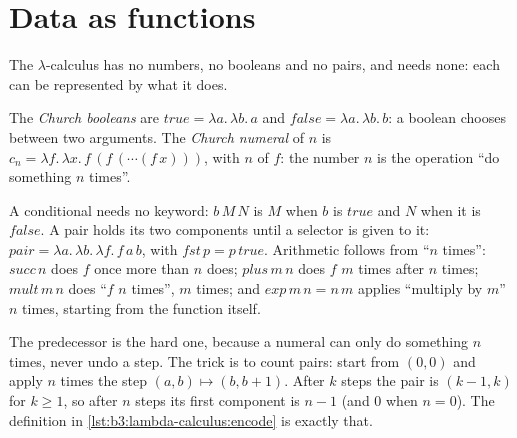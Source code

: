 \section{Data as functions}\label{sec:b3:lambda-calculus:church}

The $\lambda$-calculus has no numbers, no booleans and no pairs, and needs none: each can be represented by what it does.

\begin{definition}\label{def:b3:lambda-calculus:church}
The \emph{Church booleans} are $\mathit{true} = \lambda a.\,\lambda b.\,a$ and $\mathit{false} = \lambda a.\,\lambda b.\,b$: a boolean chooses between two arguments. The \emph{Church numeral} of $n$ is $c_n = \lambda f.\,\lambda x.\,f\,(f\,(\cdots(f\,x)))$, with $n$  of $f$: the number $n$ is the operation ``do something $n$ times''.
\end{definition}

A conditional needs no keyword: $b\,M\,N$ is $M$ when $b$ is $\mathit{true}$ and $N$ when it is $\mathit{false}$. A pair holds its two components until a selector is given to it: $\mathit{pair} = \lambda a.\,\lambda b.\,\lambda f.\,f\,a\,b$, with $\mathit{fst}\,p = p\,\mathit{true}$. Arithmetic follows from ``$n$ times'': $\mathit{succ}\,n$ does $f$ once more than $n$ does; $\mathit{plus}\,m\,n$ does $f$ $m$ times after $n$ times; $\mathit{mult}\,m\,n$ does ``$f$ $n$ times'', $m$ times; and $\mathit{exp}\,m\,n = n\,m$ applies ``multiply by $m$'' $n$ times, starting from the function itself.

\label{lst:b3:lambda-calculus:encode}

The predecessor is the hard one, because a numeral can only do something $n$ times, never undo a step. The trick is to count pairs: start from $(0, 0)$ and apply $n$ times the step $(a, b) \mapsto (b, b + 1)$. After $k$ steps the pair is $(k - 1, k)$ for $k \ge 1$, so after $n$ steps its first component is $n - 1$ (and $0$ when $n = 0$). The definition  in \cref{lst:b3:lambda-calculus:encode} is exactly that.

\label{out:b3:lambda-calculus:church}

